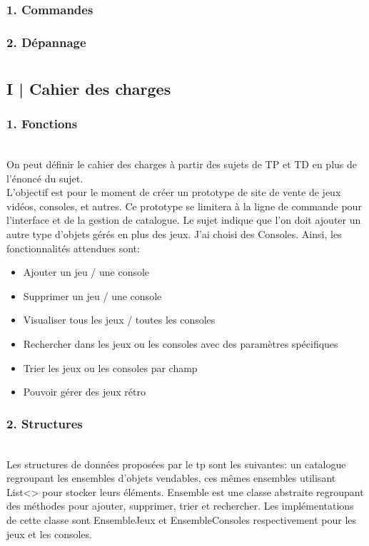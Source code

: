 \documentclass[11pt]{article}
\begin{document}
    \begin{center}
        \subsection*{1. Commandes}
        \subsection*{2. Dépannage}
    \end{center}
    
    \chapter{\Large{}}
    
\newpage
\fancyhf{}
    \section*{I | Cahier des charges}
    \subsection*{1. Fonctions}
\\
On peut définir le cahier des charges à partir des sujets de TP et TD en plus de l'énoncé du sujet.\\
L'objectif est pour le moment de créer un prototype de site de vente de jeux vidéos, consoles, et autres.
Ce prototype se limitera à la ligne de commande pour l'interface et de la gestion de catalogue. Le sujet indique que l'on doit ajouter un autre type d'objets gérés en plus des jeux. J'ai choisi des Consoles.
Ainsi, les fonctionnalités attendues sont:
    \begin{itemize}
        \item Ajouter un jeu / une console
        \item Supprimer un jeu / une console
        \item Visualiser tous les jeux / toutes les consoles
        \item Rechercher dans les jeux ou les consoles avec des paramètres spécifiques
        \item Trier les jeux ou les consoles par champ
        \item Pouvoir gérer des jeux rétro
    \end{itemize}

    \subsection*{2. Structures}
\\
Les structures de données proposées par le tp sont les suivantes: un catalogue regroupant les ensembles d'objets vendables, ces mêmes ensembles utilisant List<> pour stocker leurs éléments. Ensemble est une classe abstraite regroupant des méthodes pour ajouter, supprimer, trier et rechercher. Les implémentations de cette classe sont EnsembleJeux et EnsembleConsoles respectivement pour les jeux et les consoles.
\end{document}
